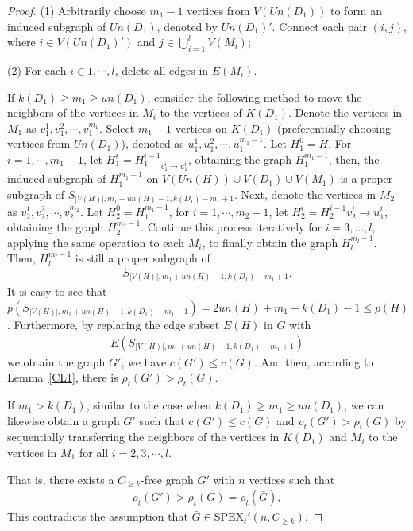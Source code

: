 \documentclass[10pt,a4paper]{amsart}
\begin{document}
\begin{proof}
            \noindent (1) Arbitrarily choose $m_1 - 1$ vertices from $V(Un(D_1))$ to form an induced subgraph of $Un(D_1)$, denoted by $Un(D_1)'$. Connect each pair $(i, j)$, where $i \in V(Un(D_1)')$ and $j \in \bigcup_{i=1}^l V(M_i)$;

            \noindent (2) For each $i \in {1, \cdots, l}$, delete all edges in $E(M_i)$.


            If $k(D_1) \geq m_1 \geq un(D_1)$, consider the following method to move the neighbors of the vertices in $M_i$ to the vertices of $K(D_1)$. Denote the vertices in $M_1$ as $v_1^1, v_1^2, \cdots, v_1^{m_1}$.
            Select $m_1 - 1$ vertices on $K(D_1)$ (preferentially choosing vertices from $Un(D_1)$), denoted as $u_1^1, u_1^2, \cdots, u_1^{m_1 - 1}$. Let $H_1^0 = H$. For $i = 1, \cdots, m_1 - 1$, let $H_1^i = {H_1^{i-1}}_{v_1^i \to u_1^i}$, obtaining the graph $H_1^{m_1 - 1}$, then, the induced subgraph of $H_1^{m_1 - 1}$ on $V(Un(H)) \cup V(D_1) \cup V(M_1)$ is a proper subgraph of $S_{|V(H)|, m_1+un(H)-1, k(D_1) - m_1 + 1}$.
            Next, denote the vertices in $M_2$ as $v_2^1, v_2^2, \cdots, v_2^{m_2}$. Let $H_2^0 = H_1^{m_1 - 1}$, for $i = 1, \cdots, m_2 - 1$, let $H_2^i = {H_2^{i-1}}{v_2^i \to u_1^i}$, obtaining the graph $H_2^{m_2 - 1}$.
            Continue this process iteratively for $i = 3, \ldots, l$, applying the same operation to each $M_i$, to finally obtain the graph $H_l^{m_l - 1}$.
            Then, $H_l^{m_l - 1}$ is still a proper subgraph of
                \begin{align*}
                        S_{|V(H)|, m_1+un(H)-1, k(D_1) - m_1 + 1}.
                \end{align*}
            It is easy to see that $p(S_{|V(H)|, m_1+un(H)-1, k(D_1) - m_1 + 1}) = 2un(H)+m_1+k(D_1)-1 \leq p(H)$.
            Furthermore, by replacing the edge subset $E(H)$ in $G$ with
                \begin{align*}
                        E(S_{|V(H)|, m_1+un(H)-1, k(D_1) - m_1 + 1})
                \end{align*}
            we obtain the graph $G'$, we have $c(G') \leq c(G)$. And then, according to Lemma~\ref{CL1}, there is $\rho_t(G') > \rho_t(G)$.


            If $m_1 > k(D_1)$, similar to the case when $k(D_1) \geq m_1 \geq un(D_1)$, we can likewise obtain a graph $G'$ such that $c(G') \leq c(G)$ and $\rho_t(G') > \rho_t(G)$ by sequentially transferring the neighbors of the vertices in $K(D_1)$ and $M_i$ to the vertices in $M_1$ for all $i = {2, 3, \cdots, l}$.



            That is, there exists a $C_{\geq k}$-free graph $G'$ with $n$ vertices such that
                    \begin{align*}
                        \rho_t(G')>\rho_t(G) = \rho_t(\bar{G}),
                    \end{align*}
            This contradicts the assumption that $\bar{G}\in \mathrm{SPEX}_t'(n,C_{\geq k})$.


        \end{proof}
\end{document}
